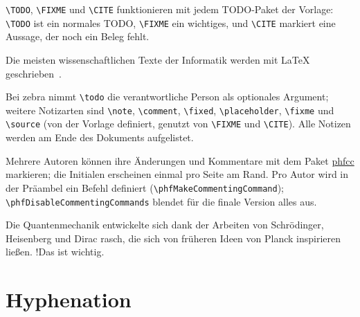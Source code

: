 \documentclass[../main-german]{subfiles}
\begin{document}
\verb|\TODO|, \verb|\FIXME| und \verb|\CITE| funktionieren mit jedem TODO-Paket der Vorlage: \verb|\TODO| ist ein normales TODO, \verb|\FIXME| ein wichtiges, und \verb|\CITE| markiert eine Aussage, der noch ein Beleg fehlt.

\begin{ltgexample}


Die meisten wissenschaftlichen Texte der Informatik werden mit \LaTeX{} geschrieben~.
\end{ltgexample}

Bei zebra nimmt \verb|\todo| die verantwortliche Person als optionales Argument; weitere Notizarten sind \verb|\note|, \verb|\comment|, \verb|\fixed|, \verb|\placeholder|, \verb|\fixme| und \verb|\source| (von der Vorlage definiert, genutzt von \verb|\FIXME| und \verb|\CITE|).
Alle Notizen werden am Ende des Dokuments aufgelistet.

\begin{ltgexample}




\end{ltgexample}


Mehrere Autoren können ihre Änderungen und Kommentare mit dem Paket \href{https://ctan.org/pkg/phfcc}{phfcc} markieren; die Initialen erscheinen einmal pro Seite am Rand.
Pro Autor wird in der Präambel ein Befehl definiert (\verb|\phfMakeCommentingCommand|); \verb|\phfDisableCommentingCommands| blendet für die finale Version alles aus.

\begin{ltgexample}
Die Quantenmechanik entwickelte sich dank der Arbeiten von Schrödinger, Heisenberg und Dirac rasch,
die sich von früheren Ideen von Planck   inspirieren ließen.
 \FA!{Das ist wichtig.}
\end{ltgexample}

\section{Hyphenation}
\end{document}

